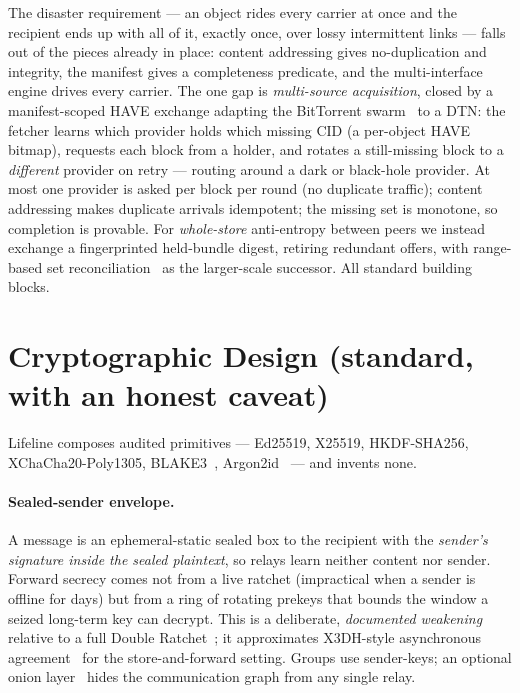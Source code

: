 \documentclass[11pt]{article}
\begin{document}
The disaster requirement --- an object rides every carrier at once and the
recipient ends up with all of it, exactly once, over lossy intermittent links ---
falls out of the pieces already in place: content addressing gives
no-duplication and integrity, the manifest gives a completeness predicate, and
the multi-interface engine drives every carrier. The one gap is \emph{multi-source
acquisition}, closed by a manifest-scoped HAVE exchange adapting the BitTorrent
swarm~\cite{cohen2003bittorrent} to a DTN: the fetcher learns which provider holds
which missing CID (a per-object HAVE bitmap), requests each block from a holder,
and rotates a still-missing block to a \emph{different} provider on retry ---
routing around a dark or black-hole provider. At most one provider is asked per
block per round (no duplicate traffic); content addressing makes duplicate
arrivals idempotent; the missing set is monotone, so completion is provable. For
\emph{whole-store} anti-entropy between peers we instead exchange a fingerprinted
held-bundle digest, retiring redundant offers, with range-based set
reconciliation~\cite{minsky2003setrec,eppstein2011difference} as the
larger-scale successor. All standard building blocks.

\section{Cryptographic Design (standard, with an honest caveat)}\label{sec:crypto}

Lifeline composes audited primitives --- Ed25519, X25519, HKDF-SHA256,
XChaCha20-Poly1305, BLAKE3~\cite{oconnor2020blake3}, Argon2id~\cite{biryukov2016argon2}
--- and invents none.

\paragraph{Sealed-sender envelope.} A message is an ephemeral-static sealed box
to the recipient with the \emph{sender's signature inside the sealed plaintext},
so relays learn neither content nor sender. Forward secrecy comes not from a live
ratchet (impractical when a sender is offline for days) but from a ring of
rotating prekeys that bounds the window a seized long-term key can decrypt. This
is a deliberate, \emph{documented weakening} relative to a full Double
Ratchet~\cite{perrin2016doubleratchet}; it approximates X3DH-style asynchronous
agreement~\cite{marlinspike2016x3dh} for the store-and-forward setting. Groups use
sender-keys; an optional onion layer~\cite{dingledine2004tor} hides the
communication graph from any single relay.
\end{document}
